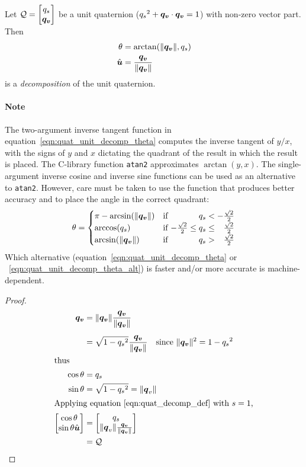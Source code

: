\begin{algorithm}\label{alg:quat_unit_decomp}
Let $\quat Q = \quatsv{q_s}{\vect{q_v}}$ be a unit quaternion
(${q_s}^2 + \boldsymbol{q_v} \cdot \boldsymbol{q_v} = 1$) with non-zero vector part. Then
\begin{align}
  \theta &=
    \arctan(\lVert\boldsymbol{q_v}\rVert, q_s) \label{eqn:quat_unit_decomp_theta} \\
  \hat{\boldsymbol{u}} &=
    \frac {\boldsymbol{q_v}}{\lVert\boldsymbol{q_v}\rVert} \label{eqn:quat_unit_decomp_uhat}
\end{align}
is a \emph{decomposition} of the unit quaternion.
\paragraph{Note}
The two-argument inverse tangent function in
equation~\eqref{eqn:quat_unit_decomp_theta}
computes the inverse tangent of $y/x$, with the signs of $y$ and $x$
dictating the quadrant of the result in which the result is placed.
The C-library function \texttt{atan2} approximates $\arctan(y,x)$.
The single-argument inverse cosine and inverse sine functions
can be used as an alternative to \texttt{atan2}.
However, care must be taken to use the function that produces
better accuracy and to place the angle in the correct quadrant:
\begin{equation}
  \theta =
    \begin{cases}
      \pi - \arcsin(\norm {\vect{q_v}}) &
        \text{if %
              $\phantom{-\frac{\surd 2}2 \leq\;}
               q_s < -\frac{\surd 2}2$} \\
      \arccos(q_s) &
         \text{if %
               $-\frac{\surd 2}2 \leq
                q_s \leq \phantom{-}\frac{\surd 2}2$} \\
      \arcsin(\norm {\vect{q_v}}) &
        \text{if %
              $\phantom{-\frac{\surd 2}2 \leq\;}
               q_s > \phantom{-}\frac{\surd 2}2$}
    \end{cases}\label{eqn:quat_unit_decomp_theta_alt}
\end{equation}
Which alternative (equation~\eqref{eqn:quat_unit_decomp_theta} or
~\eqref{eqn:quat_unit_decomp_theta_alt}) is faster and/or more accurate
is machine-dependent.
\end{algorithm}
\begin{proof}
\begin{align*}
  \vect{q_v} &= \norm{\vect{q_v}} \frac{\vect{q_v}}{\norm{\vect{q_v}}} \\[5pt]
  &= \sqrt{1-{q_s}^2}\frac{\vect{q_v}}{\norm{\vect{q_v}}}
  \quad \text{since $\norm{\vect{q_v}}^2 = 1-{q_s}^2$} \\
\intertext{thus}
  \cos\theta &= q_s \\
  \sin\theta &= \sqrt{1-{q_s}^2} = \norm{\vect q_v} \\
\intertext{Applying equation~\eqref{eqn:quat_decomp_def} with $s=1$,}
  \quatsv{\cos\theta}{\sin\theta\vhat u}
    &= \quatsv{q_s}{\norm{\vect q_v} \frac{\vect{q_v}}{\norm {\vect{q_v}}}} \\
    &= \quat Q
\end{align*}
\end{proof}

